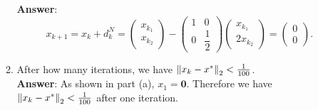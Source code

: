 \documentclass{article}
\begin{document}
\begin{enumerate}
\begin{enumerate}
                        \textbf{Answer}: \[
                              x_{k+1}=x_k+d_k^N=\begin{pmatrix}
                                    x_{k_1} \\x_{k_2}
                              \end{pmatrix}-\begin{pmatrix}
                                    1 & 0 \\0&\dfrac{1}{2}
                              \end{pmatrix}\begin{pmatrix}
                                    x_{k_1} \\2x_{k_2}
                              \end{pmatrix}=\begin{pmatrix}
                                    0 \\0
                              \end{pmatrix}.
                        \]
                  \item After how many iterations, we have $\norm{x_k-x^*}_2<\frac{1}{100}$.\\
                        \textbf{Answer}: As shown in part (a), $x_1=\bm{0}$. Therefore we have $\norm{x_k-x^*}_2<\frac{1}{100}$ after one iteration.
            \end{enumerate}
\end{enumerate}
\end{document}
